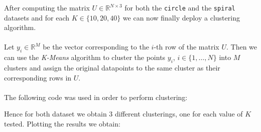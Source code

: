 After computing the matrix \(U\in \mathbb{R}^{N\times3}\) for both the \texttt{circle} and the \texttt{spiral} datasets and for each \(K \in \{10, 20, 40\}\) we can now finally deploy a clustering algorithm.
\\
\\
Let \(y_i\in \mathbb{R}^M\) be the vector corresponding to the \(i\)-th row of the matrix \(U\). Then we can use the \textit{K-Means} algorithm to cluster the points \(y_i\), \(i \in \{1, \dots, N\}\) into \(M\) clusters and assign the original datapoints to the same cluster as their corresponding rows in \(U\). 
\\
\\
The following code was used in order to perform clustering:

Hence for both dataset we obtain 3 different clusterings, one for each value of \(K\) tested. Plotting the results we obtain:
